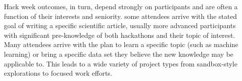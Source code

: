 Hack week outcomes, in turn, depend strongly on participants and are often a function of their interests and seniority.
some attendees arrive with the stated goal of writing a specific scientific article, usually more advanced participants with significant pre-knowledge of both hackathons and their topic of interest.
Many attendees arrive with the plan to learn a specific topic (such as machine learning) or bring a specific data set they believe the new knowledge may be applicable to.
This leads to a wide variety of project types from sandbox-style explorations to focused work efforts.
